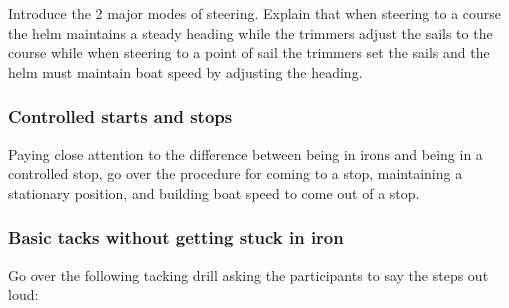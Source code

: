 \documentclass[12pt]{scrartcl}
\begin{document}
Introduce the 2 major modes of steering. Explain that when steering to a course the helm maintains a steady heading while the trimmers adjust the sails to the course while when steering to a point of sail the trimmers set the sails and the helm must maintain boat speed by adjusting the heading.

\subsubsection{Controlled starts and stops} \label{subsubsec:controlled starts and stops}

Paying close attention to the difference between being in irons and being in a controlled stop, go over the procedure for coming to a stop, maintaining a stationary position, and building boat speed to come out of a stop.

\subsubsection{Basic tacks without getting stuck in iron} \label{subsubsec:basic tacks}

Go over the following tacking drill asking the participants to say the steps out loud:
\end{document}
